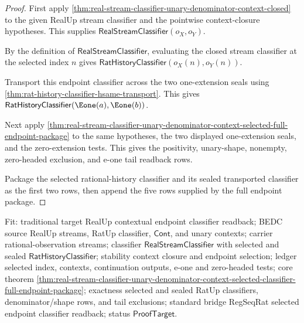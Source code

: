 \begin{proof}
First apply
\autoref{thm:real-stream-classifier-unary-denominator-context-closed} to the
given RealUp stream classifier and the pointwise context-closure hypotheses.
This supplies $\mathsf{RealStreamClassifier}(o_X,o_Y)$.

By the definition of $\mathsf{RealStreamClassifier}$, evaluating the closed
stream classifier at the selected index $n$ gives
$\mathsf{RatHistoryClassifier}(o_X(n),o_Y(n))$.

Transport this endpoint classifier across the two one-extension seals using
\autoref{thm:rat-history-classifier-hsame-transport}. This gives
$\mathsf{RatHistoryClassifier}(\Eone(a),\Eone(b))$.

Next apply
\autoref{thm:real-stream-classifier-unary-denominator-context-selected-full-endpoint-package}
to the same hypotheses, the two displayed one-extension seals, and the
zero-extension tests. This gives the positivity, unary-shape, nonempty,
zero-headed exclusion, and e-one tail readback rows.

Package the selected rational-history classifier and its sealed transported
classifier as the first two rows, then append the five rows supplied by the
full endpoint package.
\end{proof}

Fit: traditional target RealUp contextual endpoint classifier readback; BEDC
source RealUp streams, RatUp classifier, $\mathsf{Cont}$, and unary contexts;
carrier rational-observation streams; classifier $\mathsf{RealStreamClassifier}$
with selected and sealed $\mathsf{RatHistoryClassifier}$; stability context
closure and endpoint selection; ledger selected index, contexts, continuation
outputs, e-one and zero-headed tests; core theorem
\autoref{thm:real-stream-classifier-unary-denominator-context-selected-classifier-full-endpoint-package};
exactness selected and sealed RatUp classifiers, denominator/shape rows, and
tail exclusions; standard bridge RegSeqRat selected endpoint classifier
readback; status $\mathsf{ProofTarget}$.

